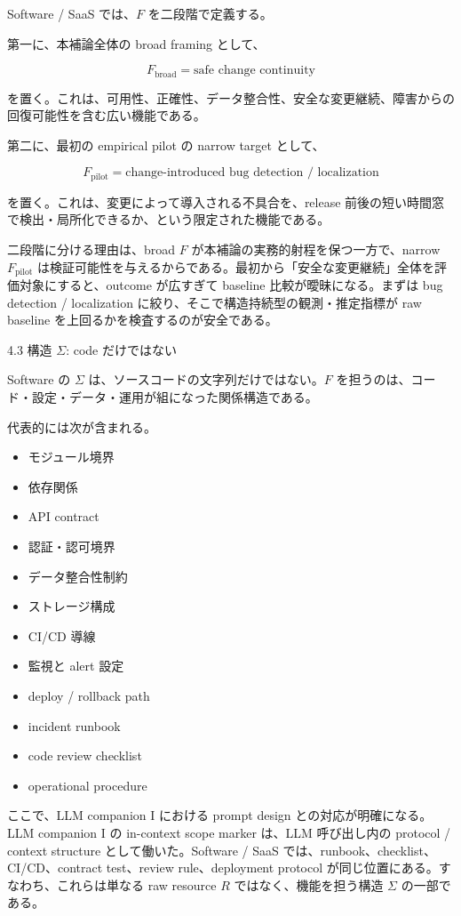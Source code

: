 \documentclass[12pt,a4paper]{article}
\begin{document}
Software / SaaS では、\(F\) を二段階で定義する。

第一に、本補論全体の broad framing として、

\[
F_{\mathrm{broad}} = \text{safe change continuity}
\]

を置く。これは、可用性、正確性、データ整合性、安全な変更継続、障害からの回復可能性を含む広い機能である。

第二に、最初の empirical pilot の narrow target として、

\[
F_{\mathrm{pilot}} = \text{change-introduced bug detection / localization}
\]

を置く。これは、変更によって導入される不具合を、release 前後の短い時間窓で検出・局所化できるか、という限定された機能である。

二段階に分ける理由は、broad \(F\) が本補論の実務的射程を保つ一方で、narrow \(F_{\mathrm{pilot}}\) は検証可能性を与えるからである。最初から「安全な変更継続」全体を評価対象にすると、outcome が広すぎて baseline 比較が曖昧になる。まずは bug detection / localization に絞り、そこで構造持続型の観測・推定指標が raw baseline を上回るかを検査するのが安全である。

4.3 構造 \(\Sigma\): code だけではない

Software の \(\Sigma\) は、ソースコードの文字列だけではない。\(F\) を担うのは、コード・設定・データ・運用が組になった関係構造である。

代表的には次が含まれる。

\begin{itemize}
\tightlist
\item
  モジュール境界
\item
  依存関係
\item
  API contract
\item
  認証・認可境界
\item
  データ整合性制約
\item
  ストレージ構成
\item
  CI/CD 導線
\item
  監視と alert 設定
\item
  deploy / rollback path
\item
  incident runbook
\item
  code review checklist
\item
  operational procedure
\end{itemize}

ここで、LLM companion I における prompt design との対応が明確になる。LLM companion I の in-context scope marker は、LLM 呼び出し内の protocol / context structure として働いた。Software / SaaS では、runbook、checklist、CI/CD、contract test、review rule、deployment protocol が同じ位置にある。すなわち、これらは単なる raw resource \(R\) ではなく、機能を担う構造 \(\Sigma\) の一部である。
\end{document}
